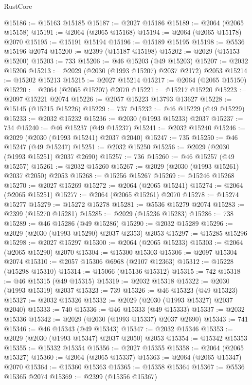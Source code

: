 \begin{lexlean}{RustCore}
\begin{coremodule}
@15186 := @15163 @15185
@15187 := @2027 @15186
@15189 := @2064 (@2065 @15158)
@15191 := @2064 (@2065 @15168)
@15194 := @2064 (@2065 @15178) @2070
@15195 := @15191 @15194
@15196 := @15189 @15195
@15198 := @5536 @15196 @2074
@15200 := @2399 (@15187 @15198)
@15202 := @2029 (@15153 @15200)
@15203 := 733
@15206 := @46 @15203 (@49 @15203)
@15207 := @2032 @15206
@15213 := @2029 (@2030 (@1993 @15207) @2037 @2172) @2053
@15214 := @15202 @15213
@15215 := @2027 @15214
@15217 := @2064 (@2065 @15150)
@15220 := @2064 (@2065 @15207) @2070
@15221 := @15217 @15220
@15223 := @2097 @15221 @2074
@15226 := @2057 @15223 @13793 @13627
@15228 := @15145 (@15215 @15226)
@15229 := 737
@15232 := @46 @15229 (@49 @15229)
@15233 := @2032 @15232
@15236 := @2030 (@1993 @15233) @2037
@15237 := 734
@15240 := @46 @15237 (@49 @15237)
@15241 := @2032 @15240
@15246 := @2029 (@2030 (@1993 @15241) @2037 @2040)
@15247 := 735
@15250 := @46 @15247 (@49 @15247)
@15251 := @2032 @15250
@15256 := @2029 (@2030 (@1993 @15251) @2037 @2690)
@15257 := 736
@15260 := @46 @15257 (@49 @15257)
@15261 := @2032 @15260
@15267 := @2029 (@2030 (@1993 @15261) @2037 @2050) @2053
@15268 := @15256 @15267
@15269 := @15246 @15268
@15270 := @2027 @15269
@15272 := @2064 (@2065 @15241)
@15274 := @2064 (@2065 @15251)
@15277 := @2064 (@2065 @15261) @2070
@15278 := @15274 @15277
@15279 := @15272 @15278
@15281 := @5536 @15279 @2074
@15283 := @2399 (@15270 @15281)
@15285 := @2029 (@15236 @15283)
@15286 := 738
@15289 := @46 @15286 (@49 @15286)
@15290 := @2032 @15289
@15296 := @2029 (@2030 (@1993 @15290) @2037 @2353) @2053
@15297 := @15285 @15296
@15298 := @2027 @15297
@15300 := @2064 (@2065 @15233)
@15303 := @2064 (@2065 @15290) @2070
@15304 := @15300 @15303
@15306 := @2097 @15304 @2074
@15310 := @2057 @15306 @6968 (@2107 @12363)
@15312 := @15228 (@15298 @15310)
@15314 := @15066 (@15136 @15312)
@15315 := 742
@15318 := @46 @15315 (@49 @15315)
@15319 := @2032 @15318
@15322 := @2030 (@1993 @15319) @2037
@15323 := 739
@15326 := @46 @15323 (@49 @15323)
@15327 := @2032 @15326
@15332 := @2029 (@2030 (@1993 @15327) @2037 @2040)
@15333 := 740
@15336 := @46 @15333 (@49 @15333)
@15337 := @2032 @15336
@15342 := @2029 (@2030 (@1993 @15337) @2037 @2690)
@15343 := 741
@15346 := @46 @15343 (@49 @15343)
@15347 := @2032 @15346
@15353 := @2029 (@2030 (@1993 @15347) @2037 @2050) @2053
@15354 := @15342 @15353
@15355 := @15332 @15354
@15356 := @2027 @15355
@15358 := @2064 (@2065 @15327)
@15360 := @2064 (@2065 @15337)
@15363 := @2064 (@2065 @15347) @2070
@15364 := @15360 @15363
@15365 := @15358 @15364
@15367 := @5536 @15365 @2074
@15369 := @2399 (@15356 @15367)

\end{coremodule}
\end{lexlean}
